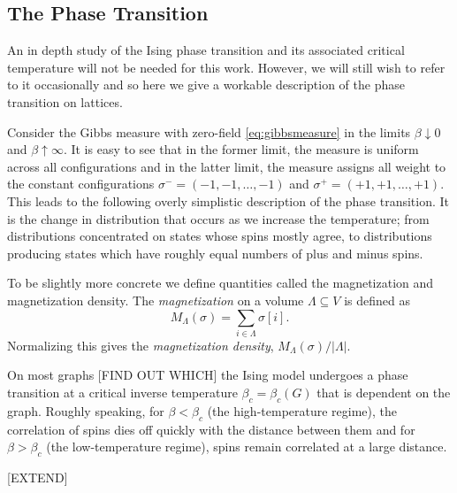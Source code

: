 	\subsection{The Phase Transition}
	An in depth study of the Ising phase transition and its associated critical temperature will not be needed for this work. However, we will still wish to refer to it occasionally and so here we give a workable description of the phase transition on lattices.

	Consider the Gibbs measure with zero-field \eqref{eq:gibbsmeasure} in the limits $\beta \downarrow 0$ and $\beta \uparrow \infty$. It is easy to see that in the former limit, the measure is uniform across all configurations and in the latter limit, the measure assigns all weight to the constant configurations $\sigma^- = (-1, -1, \dots, -1)$ and $\sigma^+ = (+1, +1, \dots, +1)$. This leads to the following overly simplistic description of the phase transition. It is the change in distribution that occurs as we increase the temperature; from distributions concentrated on states whose spins mostly agree, to distributions producing states which have roughly equal numbers of plus and minus spins.

	To be slightly more concrete we define quantities called the magnetization and magnetization density. The \emph{magnetization} on a volume $\Lambda \subseteq V$ is defined as 
	\begin{equation}
		M_\Lambda(\sigma) = \sum_{i \in \Lambda} \sigma[i].
	\end{equation}
	Normalizing this gives the \emph{magnetization density}, $M_\Lambda(\sigma)/|\Lambda|$.

	On most graphs [FIND OUT WHICH] the Ising model undergoes a phase transition at a critical inverse temperature $\beta_c = \beta_c(G)$ that is dependent on the graph. Roughly speaking, for $\beta < \beta_c$ (the high-temperature regime), the correlation of spins dies off quickly with the distance between them and for $\beta > \beta_c$ (the low-temperature regime), spins remain correlated at a large distance.

	[EXTEND]

